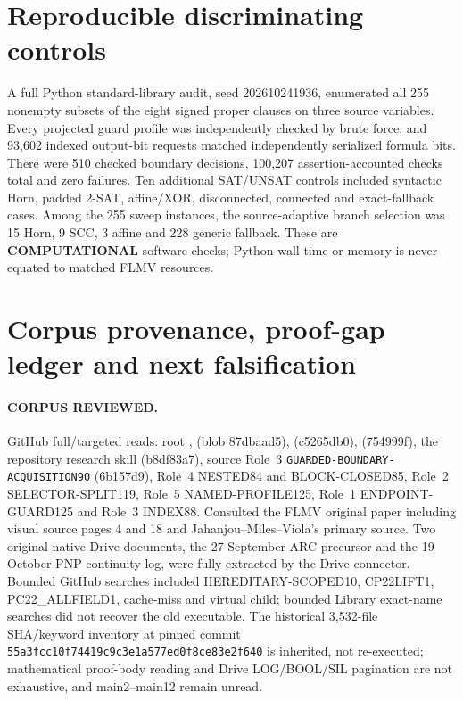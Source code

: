 \documentclass[11pt]{article}
\begin{document}
\section{Reproducible discriminating controls}
A full Python standard-library audit, seed 202610241936, enumerated all 255 nonempty subsets of the eight signed proper clauses on three source variables. Every projected guard profile was independently checked by brute force, and 93,602 indexed output-bit requests matched independently serialized formula bits. There were 510 checked boundary decisions, 100,207 assertion-accounted checks total and zero failures. Ten additional SAT/UNSAT controls included syntactic Horn, padded 2-SAT, affine/XOR, disconnected, connected and exact-fallback cases. Among the 255 sweep instances, the source-adaptive branch selection was 15 Horn, 9 SCC, 3 affine and 228 generic fallback. These are \textbf{COMPUTATIONAL} software checks; Python wall time or memory is never equated to matched FLMV resources.

\section{Corpus provenance, proof-gap ledger and next falsification}
\paragraph{CORPUS REVIEWED.} GitHub full/targeted reads: root ,  (blob 87dbaad5),  (c5265db0),  (754999f), the repository research skill (b8df83a7), source Role~3 \texttt{GUARDED-BOUNDARY-ACQUISITION90} (6b157d9), Role~4 NESTED84 and BLOCK-CLOSED85, Role~2 SELECTOR-SPLIT119, Role~5 NAMED-PROFILE125, Role~1 ENDPOINT-GUARD125 and Role~3 INDEX88. Consulted the FLMV original paper including visual source pages 4 and 18 and Jahanjou--Miles--Viola's primary source. Two original native Drive documents, the 27 September ARC precursor and the 19 October PNP continuity log, were fully extracted by the Drive connector. Bounded GitHub searches included HEREDITARY-SCOPED10, CP22LIFT1, PC22_ALLFIELD1, cache-miss and virtual child; bounded Library exact-name searches did not recover the old executable. The historical 3,532-file SHA/keyword inventory at pinned commit \texttt{55a3fcc10f74419c9c3e1a577ed0f8ce83e2f640} is inherited, not re-executed; mathematical proof-body reading and Drive LOG/BOOL/SIL pagination are not exhaustive, and main2--main12 remain unread.
\end{document}
